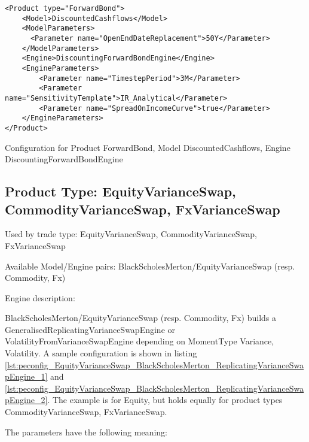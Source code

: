 \begin{longlisting}
\begin{verbatim}
<Product type="ForwardBond">
    <Model>DiscountedCashflows</Model>
    <ModelParameters>
      <Parameter name="OpenEndDateReplacement">50Y</Parameter>
    </ModelParameters>
    <Engine>DiscountingForwardBondEngine</Engine>
    <EngineParameters>
        <Parameter name="TimestepPeriod">3M</Parameter>
        <Parameter name="SensitivityTemplate">IR_Analytical</Parameter>
        <Parameter name="SpreadOnIncomeCurve">true</Parameter>
    </EngineParameters>
</Product>
\end{verbatim}
\caption{Configuration for Product ForwardBond, Model DiscountedCashflows, Engine DiscountingForwardBondEngine}
\label{lst:peconfig_ForwardBond_DiscountedCashflows_DiscountingForwardBondEngine}
\end{longlisting}

\subsection{Product Type: EquityVarianceSwap, CommodityVarianceSwap, FxVarianceSwap}

Used by trade type: EquityVarianceSwap, CommodityVarianceSwap, FxVarianceSwap

Available Model/Engine pairs: BlackScholesMerton/EquityVarianceSwap (resp. Commodity, Fx)

Engine description:

BlackScholesMerton/EquityVarianceSwap (resp. Commodity, Fx) builds a GeneralisedReplicatingVarianceSwapEngine or
VolatilityFromVarianceSwapEngine depending on MomentType Variance, Volatility. A sample configuration is shown in
listing \ref{lst:peconfig_EquityVarianceSwap_BlackScholesMerton_ReplicatingVarianceSwapEngine_1} and
\ref{lst:peconfig_EquityVarianceSwap_BlackScholesMerton_ReplicatingVarianceSwapEngine_2}. The example is for Equity, but
holds equally for product types CommodityVarianceSwap, FxVarianceSwap.

The parameters have the following meaning:


